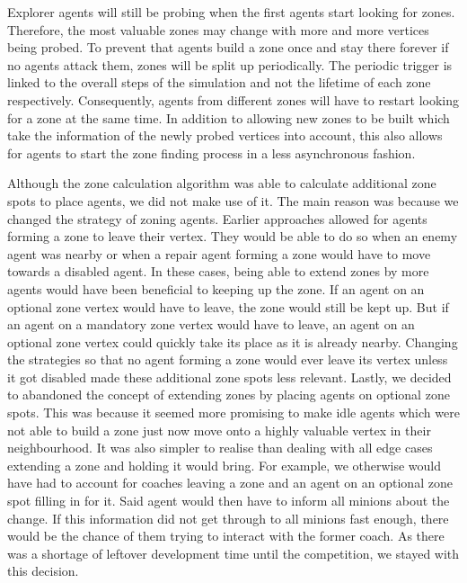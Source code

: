 Explorer agents will still be probing when the first agents start looking for zones.
Therefore, the most valuable zones may change with more and more vertices being probed.
To prevent that agents build a zone once and stay there forever if no agents attack them, zones will be split up periodically.
The periodic trigger is linked to the overall steps of the simulation and not the lifetime of each zone respectively.
Consequently, agents from different zones will have to restart looking for a zone at the same time.
In addition to allowing new zones to be built which take the information of the newly probed vertices into account, this also allows for agents to start the zone finding process in a less asynchronous fashion.

Although the zone calculation algorithm was able to calculate additional zone spots to place agents, we did not make use of it.
The main reason was because we changed the strategy of zoning agents.
Earlier approaches allowed for agents forming a zone to leave their vertex.
They would be able to do so when an enemy agent was nearby or when a repair agent forming a zone would have to move towards a disabled agent.
In these cases, being able to extend zones by more agents would have been beneficial to keeping up the zone.
If an agent on an optional zone vertex would have to leave, the zone would still be kept up.
But if an agent on a mandatory zone vertex would have to leave, an agent on an optional zone vertex could quickly take its place as it is already nearby.
Changing the strategies so that no agent forming a zone would ever leave its vertex unless it got disabled made these additional zone spots less relevant.
Lastly, we decided to abandoned the concept of extending zones by placing agents on optional zone spots.
This was because it seemed more promising to make idle agents which were not able to build a zone just now move onto a highly valuable vertex in their neighbourhood.
It was also simpler to realise than dealing with all edge cases extending a zone and holding it would bring.
For example, we otherwise would have had to account for coaches leaving a zone and an agent on an optional zone spot filling in for it.
Said agent would then have to inform all minions about the change.
If this information did not get through to all minions fast enough, there would be the chance of them trying to interact with the former coach.
As there was a shortage of leftover development time until the competition, we stayed with this decision.
